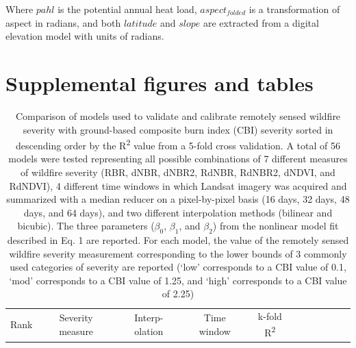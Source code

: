 \documentclass[twoside,12pt,final]{ucthesis-CA2012}
\begin{document}
\begin{ucmainmatter}
Where \(pahl\) is the potential annual heat load, \(aspect_{folded}\) is
a transformation of aspect in radians, and both \(latitude\) and
\(slope\) are extracted from a digital elevation model with units of
radians.

\section{Supplemental figures and
tables}\label{supplemental-figures-and-tables}
\begin{longtable}[]{@{}ccccccccccc@{}}
\caption{Comparison of models used to validate and calibrate remotely
sensed wildfire severity with ground-based composite burn index (CBI)
severity sorted in descending order by the R\textsuperscript{2} value
from a 5-fold cross validation. A total of 56 models were tested
representing all possible combinations of 7 different measures of
wildfire severity (RBR, dNBR, dNBR2, RdNBR, RdNBR2, dNDVI, and RdNDVI),
4 different time windows in which Landsat imagery was acquired and
summarized with a median reducer on a pixel-by-pixel basis (16 days, 32
days, 48 days, and 64 days), and two different interpolation methods
(bilinear and bicubic). The three parameters (\(\beta_0\), \(\beta_1\),
and \(\beta_2\)) from the nonlinear model fit described in Eq. 1 are
reported. For each model, the value of the remotely sensed wildfire
severity measurement corresponding to the lower bounds of 3 commonly
used categories of severity are reported (`low' corresponds to a CBI
value of 0.1, `mod' corresponds to a CBI value of 1.25, and `high'
corresponds to a CBI value of 2.25)}\tabularnewline
\toprule
\begin{minipage}[b]{0.04\columnwidth}\centering\strut
Rank\strut
\end{minipage} & \begin{minipage}[b]{0.11\columnwidth}\centering\strut
Severity measure\strut
\end{minipage} & \begin{minipage}[b]{0.06\columnwidth}\centering\strut
Interp- olation\strut
\end{minipage} & \begin{minipage}[b]{0.08\columnwidth}\centering\strut
Time window\strut
\end{minipage} & \begin{minipage}[b]{0.08\columnwidth}\centering\strut
k-fold R\textsuperscript{2}\strut
\end{minipage} & \begin{minipage}[b]{0.07\columnwidth}\centering\strut

\end{minipage}
\end{longtable}
\end{ucmainmatter}
\end{document}
